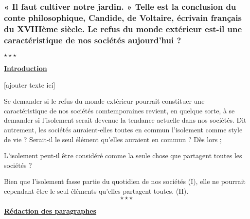 \newpage \begin{center}
	\subsubsection*{« Il faut cultiver notre jardin. » Telle est la conclusion du conte philosophique, Candide, de Voltaire, écrivain français du XVIIIème siècle. \newline Le refus du monde extérieur est-il une caractéristique de nos sociétés aujourd’hui ?}
	$\star \star \star$
\end{center}

%

\begin{center}
	\textbf{\underline{Introduction}} 
\end{center}

[ajouter texte ici] \newline

Se demander si le refus du monde extérieur pourrait constituer une caractéristique de nos sociétés comtemporaines revient, en quelque sorte, à se demander si l'isolement serait devenue la tendance actuelle dans nos sociétés. Dit autrement, les sociétés auraient-elles toutes en commun l'isolement comme style de vie ? Serait-il le seul élément qu'elles auraient en commun ? Dès lors ;

L'isolement peut-il être considéré comme la seule chose que partagent toutes les sociétés ?\newline

Bien que l'isolement fasse partie du quotidien de nos sociétés (I), elle ne pourrait cependant être le seul éléments qu'elles partagent toutes. (II).$$\star \star \star$$

\begin{center}
	\textbf{\underline{Rédaction des paragraphes}} 
\end{center}

